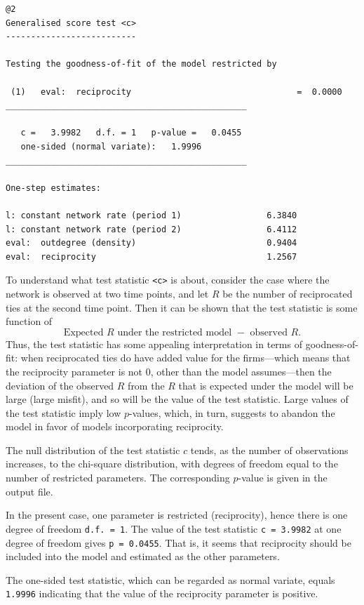 \documentclass[a4paper,fleqn,11pt]{article}
\newcommand{\+}{\, + \,}
\begin{document}
{\footnotesize
\begin{verbatim}
@2
Generalised score test <c>
--------------------------

Testing the goodness-of-fit of the model restricted by

 (1)   eval:  reciprocity                                 =  0.0000
________________________________________________

   c =   3.9982   d.f. = 1   p-value =   0.0455
   one-sided (normal variate):   1.9996
________________________________________________

One-step estimates:

l: constant network rate (period 1)                 6.3840
l: constant network rate (period 2)                 6.4112
eval:  outdegree (density)                          0.9404
eval:  reciprocity                                  1.2567
\end{verbatim}
}
To understand what test statistic {\tt <c>} is about, consider the case
where the network is observed at two time points, and let $R$
be the number of reciprocated ties at the second time point. Then it
can be shown that the test statistic is some function of
\[
  \mbox{Expected $R$ under the restricted model } - \mbox{ observed } R.
\]
Thus, the test statistic has some appealing interpretation in terms
of goodness-of-fit: when reciprocated ties do have added value for
the firms---which means that the reciprocity parameter is not 0,
other than the model assumes---then the deviation of the observed
$R$ from the $R$ that is expected under the model will be large
(large misfit), and so will be the value of the test statistic.
Large values of the test statistic imply low $p$-values, which, in
turn, suggests to abandon the model in favor of models incorporating
reciprocity.

The null distribution of the test statistic $c$ tends,
as the number of observations increases, to the chi-square
distribution, with degrees of freedom equal to the
number of restricted parameters. The corresponding $p$-value is
given in the output file.

In the present case, one parameter is restricted (reciprocity),
hence there is one degree of freedom {\tt d.f.\ = 1}. The value of
the test statistic {\tt c = 3.9982} at one degree of freedom
gives {\tt p = 0.0455}.
That is, it seems that reciprocity
should be included into the model and estimated as the other
parameters.

The one-sided test statistic, which can be regarded as normal variate, equals {\tt 1.9996}
indicating that the value of the reciprocity parameter is positive.
\end{document}
